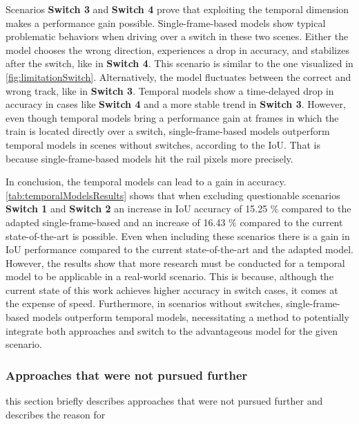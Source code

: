 Scenarios \textbf{Switch 3} and \textbf{Switch 4} prove that exploiting the temporal dimension makes a performance gain possible.
Single-frame-based models show typical problematic behaviors when driving over a switch in these two scenes.
Either the model chooses the wrong direction, experiences a drop in accuracy, and stabilizes after the switch, like in \textbf{Switch 4}.
This scenario is similar to the one visualized in \autoref{fig:limitationSwitch}.
Alternatively, the model fluctuates between the correct and wrong track, like in \textbf{Switch 3}.
Temporal models show a time-delayed drop in accuracy in cases like \textbf{Switch 4} and a more stable trend in \textbf{Switch 3}.
However, even though temporal models bring a performance gain at frames in which the train is located directly over a switch, single-frame-based models outperform temporal models in scenes without switches, according to the \ac{IoU}.
That is because single-frame-based models hit the rail pixels more precisely.

In conclusion, the temporal models can lead to a gain in accuracy.
\autoref{tab:temporalModelsResults} shows that when excluding questionable scenarios \textbf{Switch 1} and \textbf{Switch 2} an increase in \ac{IoU} accuracy of 15.25 \% compared to the adapted single-frame-based and an increase of 16.43 \% compared to the current state-of-the-art is possible.
Even when including these scenarios there is a gain in \ac{IoU} performance compared to the current state-of-the-art and the adapted model.
However, the results show that more research must be conducted for a temporal model to be applicable in a real-world scenario.
This is because, although the current state of this work achieves higher accuracy in switch cases, it comes at the expense of speed.
Furthermore, in scenarios without switches, single-frame-based models outperform temporal models, necessitating a method to potentially integrate both approaches and switch to the advantageous model for the given scenario.

\subsubsection{Approaches that were not pursued further}

this section briefly describes approaches that were not pursued further and describes the reason for 